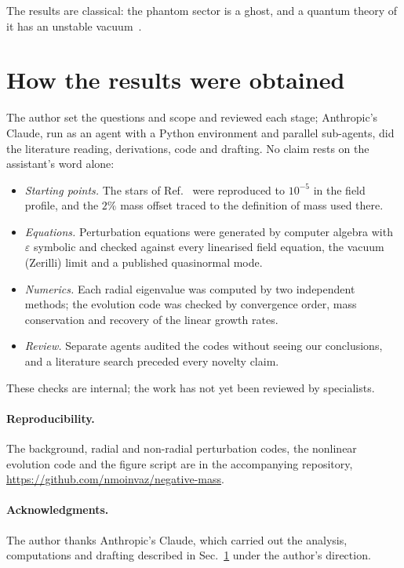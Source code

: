 \documentclass[11pt]{article}
\theoremstyle{remark}
\begin{document}
The results are classical: the phantom sector is a ghost, and a quantum theory of it has an unstable
vacuum~\cite{CJM2004}.

\section{How the results were obtained}\label{sec:method}

The author set the questions and scope and reviewed each stage; Anthropic's Claude, run as an agent with a Python
environment and parallel sub-agents, did the literature reading, derivations, code and drafting. No claim rests on
the assistant's word alone:
\begin{itemize}
\item \emph{Starting points.} The stars of Ref.~\cite{Shirokov2026} were reproduced to $10^{-5}$ in the field profile,
and the $2\%$ mass offset traced to the definition of mass used there.
\item \emph{Equations.} Perturbation equations were generated by computer algebra with $\varepsilon$ symbolic and checked
against every linearised field equation, the vacuum (Zerilli) limit and a published quasinormal mode.
\item \emph{Numerics.} Each radial eigenvalue was computed by two independent methods; the evolution code was checked by
convergence order, mass conservation and recovery of the linear growth rates.
\item \emph{Review.} Separate agents audited the codes without seeing our conclusions, and a literature search preceded
every novelty claim.
\end{itemize}
These checks are internal; the work has not yet been reviewed by specialists.

\paragraph{Reproducibility.} The background, radial and non-radial perturbation codes, the nonlinear evolution code and
the figure script are in the accompanying
repository,
\url{https://github.com/nmoinvaz/negative-mass}.

\paragraph{Acknowledgments.} The author thanks Anthropic's Claude, which carried out the analysis, computations and
drafting described in Sec.~\ref{sec:method} under the author's direction.
\end{document}
